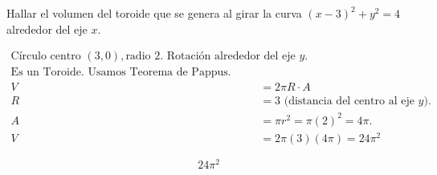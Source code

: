 Hallar el volumen del toroide que se genera al girar la curva $(x-3)^2+y^2=4$ alrededor del eje $x$.

\nopagebreak
\begin{align*}
\text{Círculo centro } (3,0), \text{radio } 2. \text{ Rotación alrededor del eje } y. \\
\text{Es un Toroide. Usamos Teorema de Pappus.} \\
V &= 2\pi R \cdot A \\
R &= 3 \text{ (distancia del centro al eje } y). \\
A &= \pi r^2 = \pi (2)^2 = 4\pi. \\
V &= 2\pi (3) (4\pi) = 24\pi^2
\end{align*}

\[
\boxed{\displaystyle 24\pi^2}
\]
